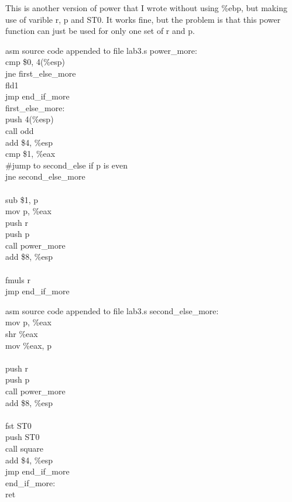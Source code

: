 \documentclass{article}
\begin{document}
\clearpage
This is another version of power that I wrote without using \%ebp, but making use of varible r, p and ST0. It works fine, but the problem is that this power function can just be used for only one set of r and p.
\begin{multicols}{2}
\begin{GFT}{asm source code appended to file lab3.s}
\+power\_more:\\
\+  cmp \$0, 4(\%esp)\\
\+  jne first\_else\_more\\
\+  fld1\\
\+  jmp end\_if\_more\\
\+first\_else\_more:\\
\+  push 4(\%esp)\\
\+  call odd\\
\+  add \$4, \%esp\\
\+  cmp \$1, \%eax\\
\+  \#jump to second\_else if p is even\\
\+  jne second\_else\_more\\
\+\\
\+  sub \$1, p\\
\+  mov p, \%eax\\
\+  push r\\
\+  push p\\
\+  call power\_more\\
\+  add \$8, \%esp\\
\+\\
\+  fmuls r\\
\+  jmp end\_if\_more\\
\end{GFT}
\columnbreak
\begin{GFT}{asm source code appended to file lab3.s}
\+second\_else\_more:\\
\+  mov p, \%eax\\
\+  shr \%eax\\
\+  mov \%eax, p\\
\+ \\
\+  push r\\
\+  push p\\
\+  call power\_more\\
\+  add \$8, \%esp\\
\+\\
\+  fst ST0\\
\+  push ST0 \\
\+  call square\\
\+  add \$4, \%esp\\
\+  jmp end\_if\_more\\
\+end\_if\_more:\\
\+  ret\\
\+\\
\end{GFT}
\end{multicols}
\end{document}

